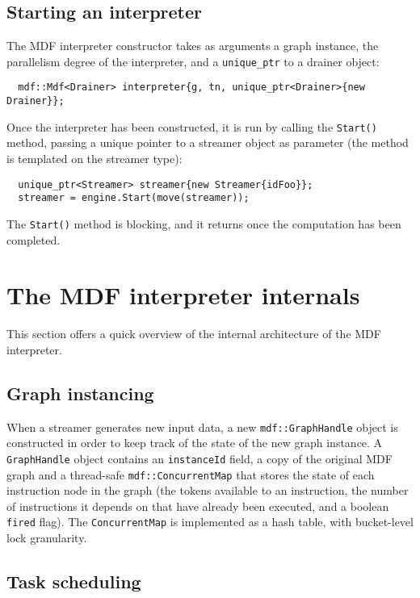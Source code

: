 \documentclass[a4paper, 11pt, oneside]{article}
\begin{document}
\subsection{Starting an interpreter}

The MDF interpreter constructor takes as arguments a graph instance, the parallelism degree of the interpreter, and a \texttt{unique\_ptr} to a drainer object:
\begin{verbatim}
  mdf::Mdf<Drainer> interpreter{g, tn, unique_ptr<Drainer>{new Drainer}};
\end{verbatim}
Once the interpreter has been constructed, it is run  by calling the \texttt{Start()} method, passing a unique pointer to a streamer object as parameter (the method is templated on the streamer type):
\begin{verbatim}
  unique_ptr<Streamer> streamer{new Streamer{idFoo}};
  streamer = engine.Start(move(streamer));
\end{verbatim}

The \texttt{Start()} method is blocking, and it returns once the computation has been completed.

\section{The MDF interpreter internals}

This section offers a quick overview of the internal architecture of the MDF interpreter.

\subsection{Graph instancing}

When a streamer generates new input data, a new \texttt{mdf::GraphHandle} object is constructed in order to keep track of the state of the new graph instance. A \texttt{GraphHandle} object contains an \texttt{instanceId} field, a copy of the original MDF graph and a thread-safe \texttt{mdf::ConcurrentMap} that stores the state of each instruction node in the graph (the tokens available to an instruction, the number of instructions it depends on that have already been executed, and a boolean \texttt{fired} flag). The \texttt{ConcurrentMap} is implemented as a hash table, with bucket-level lock granularity.

\subsection{Task scheduling}
\end{document}
